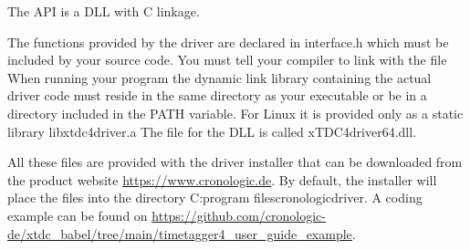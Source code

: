 
The API is a DLL with C linkage.\par

The functions provided by the driver are declared in \textsf{\tu interface.h} 
which must be included by your source code.
You must tell your compiler to link with the file 
When running your program the dynamic link library containing the actual driver code must reside in the same directory as your executable or be in a directory included in the PATH variable. For Linux it is provided only as a static library \textsf{libxtdc4\tu driver.a} 
The file for the DLL is called \textsf{xTDC4\tu driver\tu 64.dll}.

All these files are provided with the driver installer that can be downloaded from the product website \url{https://www.cronologic.de}. 
By default, the installer will place the files into the directory 
\textsf{C:\filesep program files\filesep cronologic\filesep \deviceName\filesep driver}. A coding example can be found on \url{https://github.com/cronologic-de/xtdc_babel/tree/main/timetagger4_user_guide_example}.


 
